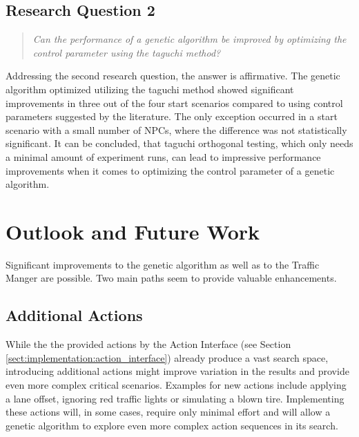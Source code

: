 \subsection{Research Question 2}
\begin{quote}
	\begin{em}
		\textit{Can the performance of a genetic algorithm be improved by optimizing the control parameter using the taguchi method?}
	\end{em}
\end{quote}

Addressing the second research question, the answer is affirmative. The genetic algorithm optimized utilizing the taguchi method showed significant improvements in three out of the four start scenarios compared to using control parameters suggested by the literature. The only exception occurred in a start scenario with a small number of NPCs, where the difference was not statistically significant. It can be concluded, that taguchi orthogonal testing, which only needs a minimal amount of experiment runs, can lead to impressive performance improvements when it comes to optimizing the control parameter of a genetic algorithm.

\section{Outlook and Future Work}
Significant improvements to the genetic algorithm as well as to the Traffic Manger are possible. Two main paths seem to provide valuable enhancements.

\subsection{Additional Actions}
While the the provided actions by the Action Interface (see Section \ref{sect:implementation:action_interface}) already produce a vast search space, introducing additional actions might improve variation in the results and provide even more complex critical scenarios. Examples for new actions include applying a lane offset, ignoring red traffic lights or simulating a blown tire. Implementing these actions will, in some cases, require only minimal effort and will allow a genetic algorithm to explore even more complex action sequences in its search.

